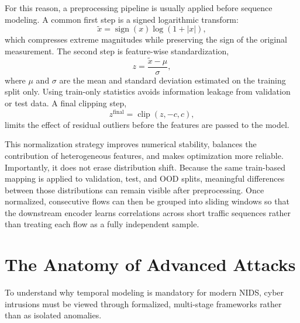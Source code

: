\documentclass[12pt, a4paper]{report}
\begin{document}
For this reason, a preprocessing pipeline is usually applied before sequence modeling. A common first step is a signed logarithmic transform:
\begin{equation}
\tilde{x} = \operatorname{sign}(x)\log(1+|x|),
\end{equation}
which compresses extreme magnitudes while preserving the sign of the original measurement. The second step is feature-wise standardization,
\begin{equation}
z = \frac{\tilde{x}-\mu}{\sigma},
\end{equation}
where $\mu$ and $\sigma$ are the mean and standard deviation estimated on the training split only. Using train-only statistics avoids information leakage from validation or test data. A final clipping step,
\begin{equation}
z^{\mathrm{final}} = \operatorname{clip}(z,-c,c),
\end{equation}
limits the effect of residual outliers before the features are passed to the model.

This normalization strategy improves numerical stability, balances the contribution of heterogeneous features, and makes optimization more reliable. Importantly, it does not erase distribution shift. Because the same train-based mapping is applied to validation, test, and OOD splits, meaningful differences between those distributions can remain visible after preprocessing. Once normalized, consecutive flows can then be grouped into sliding windows so that the downstream encoder learns correlations across short traffic sequences rather than treating each flow as a fully independent sample.

\section{The Anatomy of Advanced Attacks}
To understand why temporal modeling is mandatory for modern NIDS, cyber intrusions must be viewed through formalized, multi-stage frameworks rather than as isolated anomalies.
\end{document}

